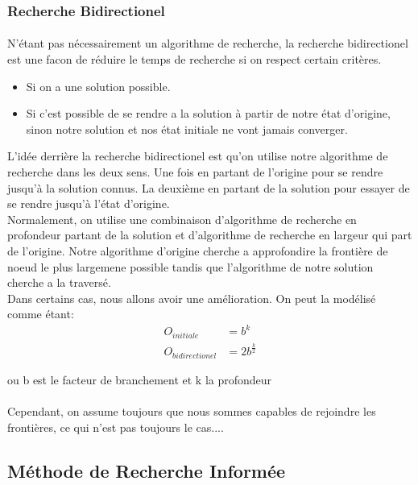 \documentclass[oneside]{book}
\begin{document}
\subsubsection{Recherche Bidirectionel}
\paragraph{}
N'étant pas nécessairement un algorithme de recherche, la recherche bidirectionel est une facon de réduire le temps de recherche si on respect certain critères.
\begin{itemize}
\item Si on a une solution possible.
\item Si c'est possible de se rendre a la solution à partir de notre état d'origine, sinon notre solution et nos état initiale ne vont jamais converger.
\end{itemize}
 L'idée derrière la recherche bidirectionel est qu'on utilise notre algorithme de recherche dans les deux sens. Une fois en partant de l'origine pour se rendre jusqu'à la solution connus. La deuxième en partant de la solution pour essayer de se rendre jusqu'à l'état d'origine. \\
 
Normalement, on utilise une combinaison d'algorithme de recherche en profondeur partant de la solution et d'algorithme de recherche en largeur qui part de l'origine. Notre algorithme d'origine cherche a approfondire la frontière de noeud le plus largemene possible tandis que l'algorithme de notre solution cherche a la traversé. \\

Dans certains cas, nous allons avoir une amélioration. On peut la modélisé comme étant:
\begin{align*}
O_{initiale} &= b^{k} \\
O_{bidirectionel} &= 2b^{\frac{k}{2}}
\end{align*}
\begin{center}
ou b est le facteur de branchement et k la profondeur
\end{center}

\paragraph{}
Cependant, on assume toujours que nous sommes capables de rejoindre les frontières, ce qui n'est pas toujours le cas....

\subsection{Méthode de Recherche Informée}
\end{document}
